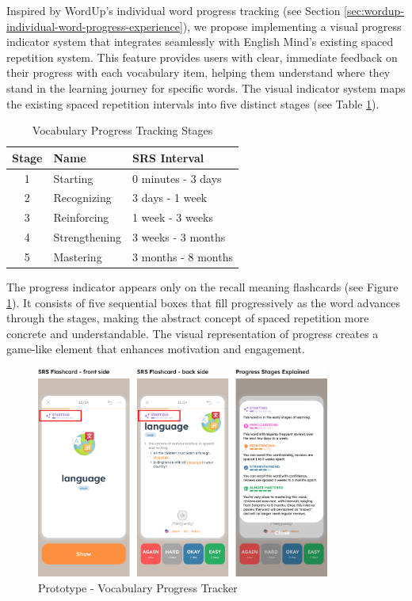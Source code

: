 Inspired by WordUp's individual word progress tracking (see Section \ref{sec:wordup-individual-word-progress-experience}), we propose implementing a visual progress indicator system that integrates seamlessly with English Mind's existing spaced repetition system. This feature provides users with clear, immediate feedback on their progress with each vocabulary item, helping them understand where they stand in the learning journey for specific words. The visual indicator system maps the existing spaced repetition intervals into five distinct stages (see Table \ref{tab:vocabulary-progress-tracking-stages}).
\begin{table}[h]
    \centering
    \begin{tabular}{|c|l|l|}
        \hline
        \textbf{Stage} & \textbf{Name} & \textbf{SRS Interval} \\
        \hline
        1 & Starting & 0 minutes - 3 days \\
        \hline
        2 & Recognizing & 3 days - 1 week \\
        \hline
        3 & Reinforcing & 1 week - 3 weeks \\
        \hline
        4 & Strengthening & 3 weeks - 3 months \\
        \hline
        5 & Mastering & 3 months - 8 months \\
        \hline
    \end{tabular}
    \caption{Vocabulary Progress Tracking Stages}
    \label{tab:vocabulary-progress-tracking-stages}
\end{table}

The progress indicator appears only on the recall meaning flashcards (see Figure \ref{fig:em-prototype-word-progress}). It consists of five sequential boxes that fill progressively as the word advances through the stages, making the abstract concept of spaced repetition more concrete and understandable. The visual representation of progress creates a game-like element that enhances motivation and engagement.

\begin{figure}[!h]
    \includegraphics[width=0.86\textwidth]{src/figures/em-prototype-progress-system.png}
    \caption{Prototype - Vocabulary Progress Tracker}
    \label{fig:em-prototype-word-progress}
\end{figure}

